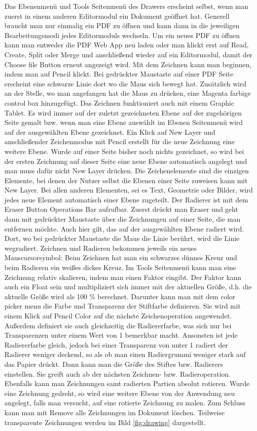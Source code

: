 Das Ebenenmenü und Tools Seitenmenü des Drawers erscheint selbst, wenn man zuerst in einem anderen Editormodul ein Dokument geöffnet hat. Generell braucht man nur einmalig ein PDF zu öffnen und kann dann in die jeweiligen Bearbeitungsmodi jedes Editormoduls wechseln. Um ein neues PDF zu öffnen kann man entweder die PDF Web App neu laden oder man klickt erst auf Read, Create, Split oder Merge und anschließend wieder auf ein Editormodul, damit der Choose file Button erneut angezeigt wird. Mit dem Zeichnen kann man beginnen, indem man auf Pencil klickt. Bei gedrückter Maustaste auf einer PDF Seite erscheint eine schwarze Linie dort wo die Maus sich bewegt hat. Zusätzlich wird an der Stelle, wo man angefangen hat die Maus zu drücken, eine Magenta farbige control box hinzugefügt. Das Zeichnen funktioniert auch mit einem Graphic Tablet. Es wird immer auf der zuletzt gezeichneten Ebene auf der zugehörigen Seite gemalt bzw. wenn man eine Ebene auswählt im Ebenen Seitenmenü wird auf der ausgewählten Ebene gezeichnet. Ein Klick auf New Layer und anschließender Zeichenmodus mit Pencil erstellt für die neue Zeichnung eine weitere Ebene. Wurde auf einer Seite bisher noch nichts gezeichnet, so wird bei der ersten Zeichnung auf dieser Seite eine neue Ebene automatisch angelegt und man muss dafür nicht New Layer drücken. Die Zeichenelemente sind die einzigen Elemente, bei denen der Nutzer selbst die Ebenen einer Seite zuweisen kann mit New Layer. Bei allen anderen Elementen, sei es Text, Geometrie oder Bilder, wird  jedes neue Element automatisch einer Ebene zugeteilt. Der Radierer ist mit dem Eraser Button Operations Bar aufrufbar. Zuerst drückt man Eraser und geht dann mit gedrückter Maustaste über die Zeichnungen auf einer Seite, die man entfernen möchte. Auch hier gilt, das auf der ausgewählten Ebene radiert wird. Dort, wo bei gedrückter Maustaste die Maus die Linie berührt, wird die Linie wegradiert. Zeichnen und Radieren bekommen jeweils ein neues Mauscursorsymbol: Beim Zeichnen hat man ein schwarzes dünnes Kreuz und beim Radieren ein weißes dickes Kreuz. Im Tools Seitenmenü kann man eine Zeichnung relativ skalieren, indem man einen Faktor eingibt. Der Faktor kann auch ein Float sein und multipliziert sich immer mit der aktuellen Größe, d.h. die aktuelle Größe wird als 100 \% berechnet. Darunter kann man mit dem color picker menu die Farbe und Transparenz der Stiftfarbe definieren. Sie wird mit einem Klick auf Pencil Color auf die nächste Zeichenoperation angewendet. Außerdem definiert sie auch gleichzeitig die Radiererfarbe, was sich nur bei Transparenzen unter einem Wert von 1 bemerkbar macht. Ansonsten ist jede Radiererfarbe gleich, jedoch bei einer Transparenz von unter 1 radiert der Radierer weniger deckend, so als ob man einen Radiergrummi weniger stark auf das Papier drückt. Dann kann man die Größe des Stiftes bzw. Radierers einstellen. Sie greift auch ab der nächsten Zeichnen- bzw. Radieroperation. Ebenfalls kann man Zeichnungen samt radierten Partien absolut rotieren. Wurde eine Zeichnung gedreht, so wird eine weitere Ebene von der Anwendung neu angelegt, falls man versucht, auf eine rotierte Zeichnung zu malen. Zum Schluss kann man mit Remove alle Zeichnungen im Dokument löschen. Teilweise transparente Zeichnungen werden im Bild \ref{fig:drawing} dargestellt. 

